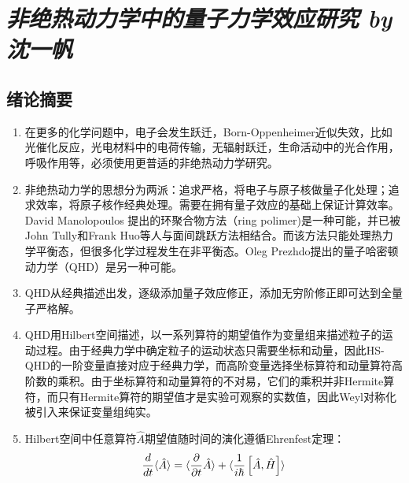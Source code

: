 \chapter{\emph{非绝热动力学中的量子力学效应研究 by 沈一帆}}

\section{绪论摘要}
\begin{enumerate}
	\item 在更多的化学问题中，电子会发生跃迁，Born-Oppenheimer近似失效，比如光催化反应，光电材料中的电荷传输，无辐射跃迁，生命活动中的光合作用，呼吸作用等，必须使用更普适的非绝热动力学研究。


	\item 非绝热动力学的思想分为两派：追求严格，将电子与原子核做量子化处理；追求效率，将原子核作经典处理。需要在拥有量子效应的基础上保证计算效率。David Manolopoulos 提出的环聚合物方法（ring polimer)是一种可能，并已被John Tully和Frank Huo等人与面间跳跃方法相结合。而该方法只能处理热力学平衡态，但很多化学过程发生在非平衡态。Oleg Prezhdo提出的量子哈密顿动力学（QHD）是另一种可能。

	\item QHD从经典描述出发，逐级添加量子效应修正，添加无穷阶修正即可达到全量子严格解。

	\item QHD用Hilbert空间描述，以一系列算符的期望值作为变量组来描述粒子的运动过程。由于经典力学中确定粒子的运动状态只需要坐标和动量，因此HS-QHD的一阶变量直接对应于经典力学，而高阶变量选择坐标算符和动量算符高阶数的乘积。由于坐标算符和动量算符的不对易，它们的乘积并非Hermite算符，而只有Hermite算符的期望值才是实验可观察的实数值，因此Weyl对称化被引入来保证变量组纯实。

	\item Hilbert空间中任意算符$\hat{A}$期望值随时间的演化遵循Ehrenfest定理：
	\begin{equation}
	\frac{d}{dt}\langle \hat{A} \rangle=\langle \frac{\partial}{\partial t} \hat{A} \rangle+\langle \frac{1}{i\hbar}\left[\hat{A},\hat{H}\right] \rangle
	\end{equation}


\end{enumerate}
